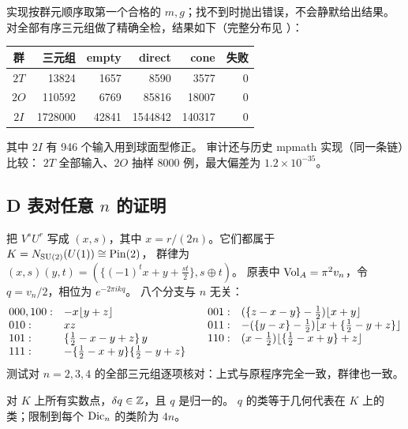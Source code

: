 实现按群元顺序取第一个合格的 $m,g$；找不到时抛出错误，不会静默给出结果。
对全部有序三元组做了精确全检，结果如下（完整分布见 ）：
\begin{center}\small
\begin{tabular}{@{}crrrrr@{}}\toprule
群&三元组&empty&direct&cone&失败\\\midrule
$2T$&13824&1657&8590&3577&0\\
$2O$&110592&6769&85816&18007&0\\
$2I$&1728000&42841&1544842&140317&0\\\bottomrule
\end{tabular}\end{center}
其中 $2I$ 有 946 个输入用到球面型修正。
审计还与历史 mpmath 实现（同一条链）比较：
$2T$ 全部输入、$2O$ 抽样 8000 例，最大偏差为 $1.2\times10^{-35}$。

\subsection{D 表对任意 $n$ 的证明}

把 $V^sU^r$ 写成 $(x,s)$，其中 $x=r/(2n)$。它们都属于 $K=N_{\mathrm{SU}(2)}(U(1))\cong\mathrm{Pin}(2)$，
群律为 $(x,s)(y,t)=(\{(-1)^tx+y+\tfrac{st}2\},s\oplus t)$。
原表中 $\operatorname{Vol}_A=\pi^2v_n$，令 $q=v_n/2$，相位为 $e^{-2\pi ikq}$。
八个分支与 $n$ 无关：
\[
\begin{array}{@{}ll@{\qquad}ll@{}}
000,100:&-x\lfloor y+z\rfloor & 001:&(\{z-x-y\}-\tfrac12)\lfloor x+y\rfloor\\
010:&xz & 011:&-(\{y-x\}-\tfrac12)\lfloor x+\{\tfrac12-y+z\}\rfloor\\
101:&\{\tfrac12-x-y+z\}\,y & 110:&(x-\tfrac12)\lfloor\{\tfrac12-x+y\}+z\rfloor\\
111:&-\{\tfrac12-x+y\}\{\tfrac12-y+z\}&&
\end{array}
\]
测试对 $n=2,3,4$ 的全部三元组逐项核对：上式与原程序完全一致，群律也一致。

\begin{theorem}\label{thm:dic-all-n}
对 $K$ 上所有实数点，$\delta q\in\mathbb Z$，且 $q$ 是归一的。
$q$ 的类等于几何代表在 $K$ 上的类；限制到每个 $\mathrm{Dic}_n$ 的类阶为 $4n$。
\end{theorem}


